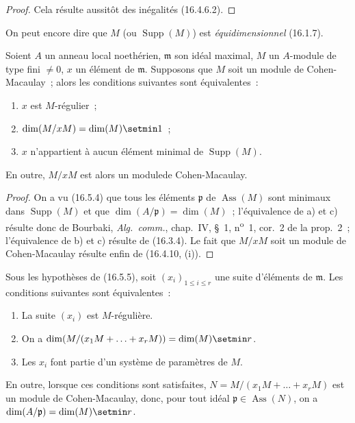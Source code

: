 \begin{proof}
Cela résulte aussitôt des inégalités (16.4.6.2).
\end{proof}

On peut encore dire que $M$ (ou $\operatorname{Supp}(M)$) est
\emph{équidimensionnel} (16.1.7).


\begin{proposition}[16.5.5]
\label{0.16.5.5-fr}
Soient $A$ un anneau local noethérien, $\mathfrak{m}$ son idéal maximal, $M$
un $A$-module de type fini $\neq0$, $x$ un élément de $\mathfrak{m}$.
Supposons que $M$ soit un module de Cohen-Macaulay~; alors les conditions
suivantes sont équivalentes~:
\begin{enumerate}
  \item[\textup{a)}] $x$ est $M$-régulier~;
  \item[\textup{b)}] $\dim(M/xM)=\dim(M)\setmin 1$~;
  \item[\textup{c)}] $x$ n'appartient à aucun élément minimal de
  $\operatorname{Supp}(M)$.
\end{enumerate}
En outre, $M/xM$ est alors un modulede Cohen-Macaulay.
\end{proposition}

\begin{proof}
On a vu (16.5.4) que tous les éléments $\mathfrak{p}$ de
$\operatorname{Ass}(M)$ sont minimaux dans $\operatorname{Supp}(M)$ et que
$\dim(A/\mathfrak{p})=\dim(M)$~; l'équivalence de a) et c) résulte donc de
Bourbaki, \emph{Alg.~comm.}, chap.~IV, \S~1, n\textsuperscript{o}~1, cor.~2 de la prop.~2~;
l'équivalence de b) et c) résulte de (16.3.4). Le fait que $M/xM$ soit un
module de Cohen-Macaulay résulte enfin de (16.4.10, (i)).
\end{proof}

\begin{corollary}[16.5.6]
\label{0.16.5.6-fr}
Sous les hypothèses de \textup{(16.5.5)}, soit $(x_i)_{1\leq i\leq r}$ une suite
d'éléments de $\mathfrak{m}$. Les conditions suivantes sont équivalentes~:
\begin{enumerate}
  \item[\textup{a)}] La suite $(x_i)$ est $M$-régulière.
  \item[\textup{b)}] On a
  $\dim(M/(x_1M+\ldots+x_rM))=\dim(M)\setmin r$.
  \item[\textup{c)}] Les $x_i$ font partie d'un système de paramètres de $M$.
\end{enumerate}
En outre, lorsque ces conditions sont satisfaites,
$N=M/(x_1M+\ldots+x_rM)$ est un module de Cohen-Macaulay, donc, pour tout
idéal $\mathfrak{p}\in\operatorname{Ass}(N)$, on a
$\dim(A/\mathfrak{p})=\dim(M)\setmin r$.
\end{corollary}


